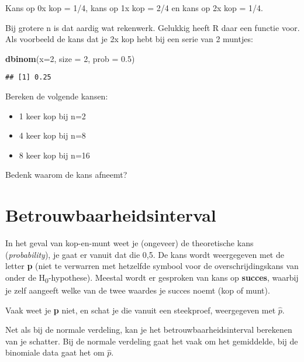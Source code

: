 \documentclass[]{book}
\newenvironment{Shaded}{\begin{snugshade}}{\end{snugshade}}
\newcommand{\KeywordTok}[1]{\textcolor[rgb]{0.13,0.29,0.53}{\textbf{{#1}}}}
\newcommand{\DataTypeTok}[1]{\textcolor[rgb]{0.13,0.29,0.53}{{#1}}}
\newcommand{\DecValTok}[1]{\textcolor[rgb]{0.00,0.00,0.81}{{#1}}}
\newcommand{\FloatTok}[1]{\textcolor[rgb]{0.00,0.00,0.81}{{#1}}}
\newcommand{\NormalTok}[1]{{#1}}
\providecommand{\tightlist}{%
  \setlength{\itemsep}{0pt}\setlength{\parskip}{0pt}}
\theoremstyle{definition}
\theoremstyle{definition}
\theoremstyle{definition}
\theoremstyle{remark}
\let\BeginKnitrBlock\begin \let\EndKnitrBlock\end
\begin{document}
Kans op 0x kop = 1/4, kans op 1x kop = 2/4 en kans op 2x kop = 1/4.

Bij grotere n is dat aardig wat rekenwerk. Gelukkig heeft R daar een
functie voor. Als voorbeeld de kans dat je 2x kop hebt bij een serie van
2 muntjes:

\begin{Shaded}
\begin{Highlighting}[]
\KeywordTok{dbinom}\NormalTok{(}\DataTypeTok{x=}\DecValTok{2}\NormalTok{, }\DataTypeTok{size =} \DecValTok{2}\NormalTok{, }\DataTypeTok{prob =} \FloatTok{0.5}\NormalTok{)}
\end{Highlighting}
\end{Shaded}

\begin{verbatim}
## [1] 0.25
\end{verbatim}

\BeginKnitrBlock{exercise}
\protect\hypertarget{exr:kop-of-munt}{}{\label{exr:kop-of-munt} }Bereken de
volgende kansen:

\begin{itemize}
\tightlist
\item
  1 keer kop bij n=2
\item
  4 keer kop bij n=8
\item
  8 keer kop bij n=16
\end{itemize}

Bedenk waarom de kans afneemt?
\EndKnitrBlock{exercise}

\section{Betrouwbaarheidsinterval}\label{betrouwbaarheidsinterval}

In het geval van kop-en-munt weet je (ongeveer) de theoretische kans
(\emph{probability}), je gaat er vanuit dat die 0,5. De kans wordt
weergegeven met de letter \textbf{p} (niet te verwarren met hetzelfde
symbool voor de overschrijdingskans van onder de
H\textsubscript{0}-hypothese). Meestal wordt er gesproken van kans op
\textbf{succes}, waarbij je zelf aangeeft welke van de twee waardes je
succes noemt (kop of munt).

Vaak weet je \textbf{p} niet, en schat je die vanuit een steekproef,
weergegeven met \(\hat{p}\).

Net als bij de normale verdeling, kan je het betrouwbaarheidsinterval
berekenen van je schatter. Bij de normale verdeling gaat het vaak om het
gemiddelde, bij de binomiale data gaat het om \(\hat{p}\).
\end{document}
